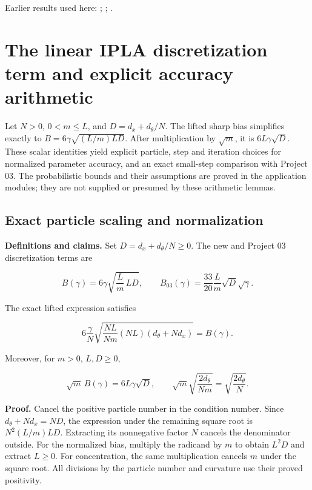 \documentclass[11pt,a4paper]{report}
\begin{document}
Earlier results used here: \cite[Section~3.1.1]{LangevinLean2026IPLA}; \cite[Section~3.1.3]{LangevinLean2026IPLA}; \cite[Section~3.1.4]{LangevinLean2026IPLA}.
\section{\texorpdfstring{The linear IPLA discretization term and explicit accuracy arithmetic}{The linear IPLA discretization term and explicit accuracy arithmetic}}
\label{proof-module-WassersteinMixing-IPLARates-lean}


Let \(N>0\), \(0<m\le L\), and \(D=d_x+d_\theta/N\). The lifted sharp bias simplifies exactly to \(B=6\gamma\sqrt{(L/m)LD}\). After multiplication by \(\sqrt m\), it is \(6L\gamma\sqrt D\). These scalar identities yield explicit particle, step and iteration choices for normalized parameter accuracy, and an exact small-step comparison with Project 03. The probabilistic bounds and their assumptions are proved in the application modules; they are not supplied or presumed by these arithmetic lemmas.

\subsection{\texorpdfstring{Exact particle scaling and normalization}{Exact particle scaling and normalization}}
\label{report-step-WassersteinMixing-IPLARates-lean-1}


\textbf{Definitions and claims.} Set \(D=d_x+d_\theta/N\ge0\). The new and Project 03 discretization terms are

\[B(\gamma)=6\gamma\sqrt{\frac Lm\,LD},\qquad B_{03}(\gamma)=\frac{33}{20}\frac Lm\sqrt D\sqrt\gamma.\]


The exact lifted expression satisfies

\[6\frac\gamma N\sqrt{\frac{NL}{Nm}(NL)(d_\theta+Nd_x)}=B(\gamma).\]


Moreover, for \(m>0\), \(L,D\ge0\),

\[\sqrt m\,B(\gamma)=6L\gamma\sqrt D,\qquad \sqrt m\sqrt{\frac{2d_\theta}{Nm}}=\sqrt{\frac{2d_\theta}{N}}.\]


\textbf{Proof.} Cancel the positive particle number in the condition number. Since \(d_\theta+Nd_x=ND\), the expression under the remaining square root is \(N^2(L/m)LD\). Extracting its nonnegative factor \(N\) cancels the denominator outside. For the normalized bias, multiply the radicand by \(m\) to obtain \(L^2D\) and extract \(L\ge0\). For concentration, the same multiplication cancels \(m\) under the square root. All divisions by the particle number and curvature use their proved positivity.
\end{document}

